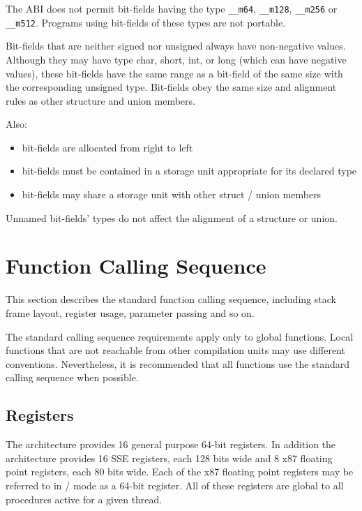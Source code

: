The ABI does not permit bit-fields having the type \texttt{__m64},
\texttt{__m128}, \texttt{__m256} or \texttt{__m512}.  Programs using
bit-fields of these types are not portable.

Bit-fields that are neither signed nor unsigned
always have non-negative values. Although they may have type char,
short, int, or long (which can have negative values), these bit-fields
have the same range as a bit-field of the same size with the
corresponding unsigned type. Bit-fields obey the same size and
alignment rules as other structure and union members.

Also:
\begin{itemize}
 \item bit-fields are allocated from right to left
 \item bit-fields must be contained in a storage unit appropriate 
       for its declared type
 \item bit-fields may share a storage unit with other struct / union members
\end{itemize}

Unnamed bit-fields' types do not affect the alignment of a structure
or union.


\section{Function Calling Sequence}

This section describes the standard function calling sequence,
including stack frame layout, register usage, parameter passing and so
on.

The standard calling sequence requirements apply only to global
functions.  Local functions that are not reachable from other
compilation units may use different conventions.  Nevertheless, it is
recommended that all functions use the standard calling sequence when
possible.

\subsection{Registers}
\label{subsec-registers}

The \xARCH architecture provides 16 general purpose 64-bit registers.
In addition the architecture provides 16 SSE registers, each 128 bits
wide and 8 x87 floating point registers, each 80 bits wide.  Each of
the x87 floating point registers may be referred to in \MMX/\threednow
mode as a 64-bit register.  All of these registers are global to all
procedures active for a given thread.


